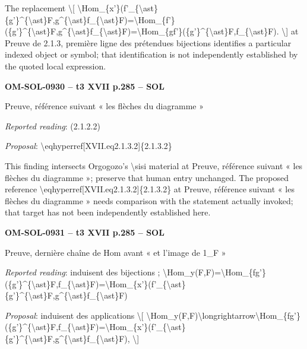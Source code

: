 The replacement \textbackslash{}[ \textbackslash{}Hom\_\{x'\}(f'\_\{\textbackslash{}ast\}\{g'\}\textasciicircum{}\{\textbackslash{}ast\}F,g\textasciicircum{}\{\textbackslash{}ast\}f\_\{\textbackslash{}ast\}F)=\allowbreak \textbackslash{}Hom\_\{f'\}(\{g'\}\textasciicircum{}\{\textbackslash{}ast\}F,g\textasciicircum{}\{\textbackslash{}ast\}f\_\{\textbackslash{}ast\}F)=\allowbreak \textbackslash{}Hom\_\{gf'\}(\{g'\}\textasciicircum{}\{\textbackslash{}ast\}F,f\_\{\textbackslash{}ast\}F). \textbackslash{}] at Preuve de 2.1.3, première ligne des prétendues bijections identifies a particular indexed object or symbol; that identification is not independently established by the quoted local expression.\par
\par\noindent\textbf{OM-SOL-0930 -- t3 XVII p.285 -- SOL}\par
Preuve, référence suivant « les flèches du diagramme »\par
\emph{Reported reading}: (2.1.2.2)\par
\emph{Proposal}: \textbackslash{}eqhyperref[XVII.eq2.1.3.2]\{2.1.3.2\}\par
This finding intersects Orgogozo's \textbackslash{}sisi material at Preuve, référence suivant « les flèches du diagramme »; preserve that human entry unchanged. The proposed reference \textbackslash{}eqhyperref[XVII.eq2.1.3.2]\{2.1.3.2\} at Preuve, référence suivant « les flèches du diagramme » needs comparison with the statement actually invoked; that target has not been independently established here.\par
\par\noindent\textbf{OM-SOL-0931 -- t3 XVII p.285 -- SOL}\par
Preuve, dernière chaîne de Hom avant « et l'image de 1\_F »\par
\emph{Reported reading}: induisent des bijections ; \textbackslash{}Hom\_y(F,F)=\allowbreak \textbackslash{}Hom\_\{fg'\}(\{g'\}\textasciicircum{}\{\textbackslash{}ast\}F,f\_\{\textbackslash{}ast\}F)=\allowbreak \textbackslash{}Hom\_\{x'\}(f'\_\{\textbackslash{}ast\}\{g'\}\textasciicircum{}\{\textbackslash{}ast\}F,g\textasciicircum{}\{\textbackslash{}ast\}f\_\{\textbackslash{}ast\}F)\par
\emph{Proposal}: induisent des applications \textbackslash{}[ \textbackslash{}Hom\_y(F,F)\textbackslash{}longrightarrow\textbackslash{}Hom\_\{fg'\}(\{g'\}\textasciicircum{}\{\textbackslash{}ast\}F,f\_\{\textbackslash{}ast\}F)=\allowbreak \textbackslash{}Hom\_\{x'\}(f'\_\{\textbackslash{}ast\}\{g'\}\textasciicircum{}\{\textbackslash{}ast\}F,g\textasciicircum{}\{\textbackslash{}ast\}f\_\{\textbackslash{}ast\}F), \textbackslash{}]\par
